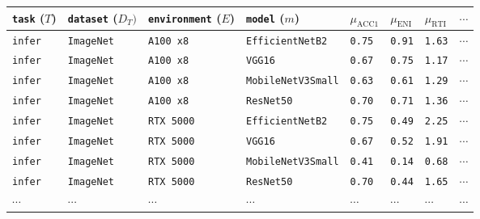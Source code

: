 
    \begin{tabular}{llll|llll}
        \toprule 
        \texttt{task} ($T$) & \texttt{dataset} ($D_T)$ & \texttt{environment} ($E$) & \texttt{model} ($m$) & $\mu_{\text{ACC1}}$ & $\mu_{\text{ENI}}$ & $\mu_{\text{RTI}}$ & $\cdots$ \\
        \midrule
        \texttt{infer} & \texttt{ImageNet} & \texttt{A100 x8} & \texttt{EfficientNetB2} & \texttt{0.75} & \texttt{0.91} & \texttt{1.63} & $\cdots$ \\
        \texttt{infer} & \texttt{ImageNet} & \texttt{A100 x8} & \texttt{VGG16} & \texttt{0.67} & \texttt{0.75} & \texttt{1.17} & $\cdots$ \\
        \texttt{infer} & \texttt{ImageNet} & \texttt{A100 x8} & \texttt{MobileNetV3Small} & \texttt{0.63} & \texttt{0.61} & \texttt{1.29} & $\cdots$ \\
        \texttt{infer} & \texttt{ImageNet} & \texttt{A100 x8} & \texttt{ResNet50} & \texttt{0.70} & \texttt{0.71} & \texttt{1.36} & $\cdots$ \\
        \texttt{infer} & \texttt{ImageNet} & \texttt{RTX 5000} & \texttt{EfficientNetB2} & \texttt{0.75} & \texttt{0.49} & \texttt{2.25} & $\cdots$ \\
        \texttt{infer} & \texttt{ImageNet} & \texttt{RTX 5000} & \texttt{VGG16} & \texttt{0.67} & \texttt{0.52} & \texttt{1.91} & $\cdots$ \\
        \texttt{infer} & \texttt{ImageNet} & \texttt{RTX 5000} & \texttt{MobileNetV3Small} & \texttt{0.41} & \texttt{0.14} & \texttt{0.68} & $\cdots$ \\
        \texttt{infer} & \texttt{ImageNet} & \texttt{RTX 5000} & \texttt{ResNet50} & \texttt{0.70} & \texttt{0.44} & \texttt{1.65} & $\cdots$ \\
        $\cdots$ & $\cdots$ & $\cdots$ & $\cdots$ & $\cdots$ & $\cdots$ & $\cdots$ & $\cdots$ \\
        \bottomrule
    \end{tabular}